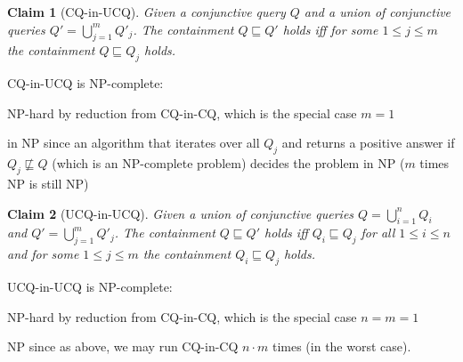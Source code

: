 \documentclass[a4paper,12pt]{article}
\newtheorem{claim}{Claim}
\begin{document}
\begin{claim}[CQ-in-UCQ]
Given a conjunctive query $Q$ and a union of conjunctive queries $Q' = \bigcup_{j=1}^m Q'_j$. The containment $Q \sqsubseteq Q'$ holds iff for some $1 \leq j \leq m$ the containment $Q \sqsubseteq Q_j$ holds.
\end{claim}

CQ-in-UCQ is NP-complete:

\begin{description}
\item{NP-hard} by reduction from CQ-in-CQ, which is the special case $m = 1$
\item{in NP} since an algorithm that iterates over all $Q_j$ and returns a positive answer if $Q_j \not \sqsubseteq Q$ (which is an NP-complete problem) decides the problem in NP ($m$ times NP is still NP)
\end{description}

\begin{claim}[UCQ-in-UCQ]
Given a union of conjunctive queries $Q = \bigcup_{i=1}^n Q_i$ and $Q' = \bigcup_{j=1}^m Q'_j$. The containment $Q \sqsubseteq Q'$ holds iff $Q_i \sqsubseteq Q_j$ for all $1 \leq i \leq n$ and for some $1 \leq j \leq m$ the containment $Q_i \sqsubseteq Q_j$ holds.
\end{claim}

UCQ-in-UCQ is NP-complete:

\begin{description}
\item{NP-hard} by reduction from CQ-in-CQ, which is the special case $n = m = 1$
\item{NP} since as above, we may run CQ-in-CQ $n \cdot m$ times (in the worst case).
\end{description}
\end{document}
